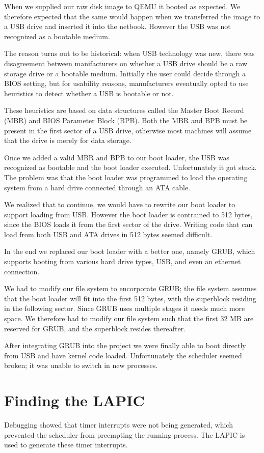 \documentclass{report}
\begin{document}
When we supplied our raw disk image to QEMU it booted as expected. We
therefore expected that the same would happen when we transferred the image to
a USB drive and inserted it into the netbook. However the USB was not
recognized as a bootable medium. 

The reason turns out to be historical: when USB technology was new, there was
disagreement between manifacturers on whether a USB drive should be a raw
storage drive or a bootable medium. Initially the user could decide through a
BIOS setting, but for usability reasons, manufacturers eventually opted to use
heuristics to detect whether a USB is bootable or not. 

These heuristics are based on data structures called the Master Boot Record
(MBR) and BIOS Parameter Block (BPB). Both the MBR and BPB must be present in
the first sector of a USB drive, otherwise most machines will assume that the
drive is merely for data storage. 

Once we added a valid MBR and BPB to our boot loader, the USB was recognized
as bootable and the boot loader executed. Unfortunately it got stuck. The
problem was that the boot loader was programmed to load the operating system
from a hard drive connected through an ATA cable.

We realized that to continue, we would have to rewrite our boot loader to
support loading from USB. However the boot loader is contrained to 512 bytes,
since the BIOS loads it from the first sector of the drive. Writing code that
can load from both USB and ATA drives in 512 bytes seemed difficult.

In the end we replaced our boot loader with a better one, namely GRUB, which
supports booting from various hard drive types, USB, and even an ethernet
connection. 

We had to modify our file system to encorporate GRUB; the file system assumes
that the boot loader will fit into the first 512 bytes, with the superblock
residing in the following sector. Since GRUB uses multiple stages it needs
much more space. We therefore had to modify our file system such that the
first 32 MB are reserved for GRUB, and the superblock resides thereafter.

After integrating GRUB into the project we were finally able to boot directly
from USB and have kernel code loaded. Unfortunately the scheduler seemed
broken; it was unable to switch in new processes.



\section{Finding the LAPIC}
Debugging showed that timer interrupts were not being generated, which
prevented the scheduler from preempting the running process. The LAPIC is
used to generate these timer interrupts.
\end{document}

